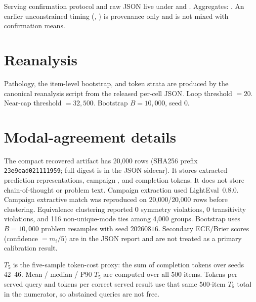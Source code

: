 \documentclass[11pt,a4paper]{article}
\begin{document}
Serving confirmation protocol and raw JSON live under  and . Aggregates: . An earlier unconstrained timing (, ) is provenance only and is not mixed with confirmation means.

\section{Reanalysis}
Pathology, the item-level bootstrap, and token strata are produced by the canonical reanalysis script from the released per-cell JSON. Loop threshold $=20$. Near-cap threshold $=32{,}500$. Bootstrap $B=10{,}000$, seed $0$.

\section{Modal-agreement details}
\label{app:modal}
The compact recovered artifact has 20{,}000 rows (SHA256 prefix \texttt{23e9ead021111959}; full digest is in the JSON sidecar). It stores extracted prediction representations, campaign , and completion tokens. It does not store chain-of-thought or problem text. Campaign extraction used LightEval~0.8.0. Campaign extractive match was reproduced on 20{,}000/20{,}000 rows before clustering. Equivalence clustering reported 0 symmetry violations, 0 transitivity violations, and 116 non-unique-mode ties among 4{,}000 groups. Bootstrap uses $B=10{,}000$ problem resamples with seed $20260816$. Secondary ECE/Brier scores (confidence $=m_i/5$) are in the JSON report and are not treated as a primary calibration result.

$T_5$ is the five-sample token-cost proxy: the sum of completion tokens over seeds 42--46. Mean / median / P90 $T_5$ are computed over all 500 items. Tokens per served query and tokens per correct served result use that same 500-item $T_5$ total in the numerator, so abstained queries are not free.
\end{document}
